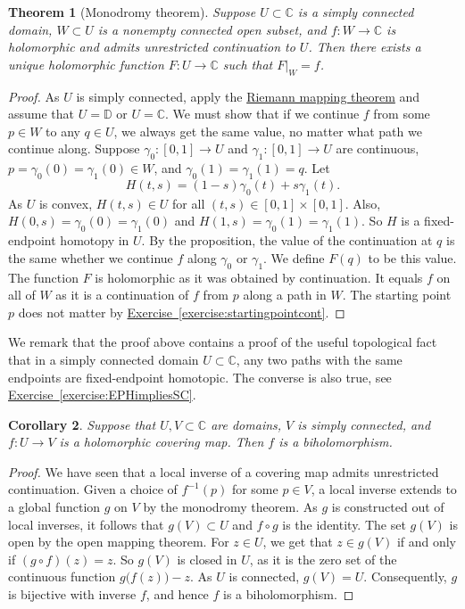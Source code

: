 \documentclass[12pt,openany]{book}
\newcommand{\C}{{\mathbb{C}}}
\newcommand{\D}{{\mathbb{D}}}
\theoremstyle{plain}
\newtheorem{thm}{Theorem}[section]
\newtheorem{cor}[thm]{Corollary}
\theoremstyle{remark}
\theoremstyle{definition}
\theoremstyle{exercise}
\theoremstyle{example}
\newcommand{\exerciseref}[1]{\hyperref[#1]{Exercise~\ref*{#1}}}
\begin{document}
\begin{thm}[Monodromy theorem]
Suppose $U \subset \C$ is a simply connected domain, $W \subset U$ is a
nonempty connected open subset, and
$f \colon W \to \C$ is holomorphic and admits unrestricted continuation
to $U$.  Then there exists
a unique holomorphic function $F \colon U \to \C$ such that $F|_W = f$.
\end{thm}

\begin{proof}
As $U$ is simply connected, apply the
\hyperref[thm:RMT]{Riemann mapping theorem}
and
assume that $U=\D$ or $U = \C$.
We must show that if we continue $f$ from some $p \in W$ to any $q \in U$, we
always get the same value,
no matter what path we continue along.
Suppose $\gamma_0 \colon [0,1] \to U$ and
$\gamma_1 \colon [0,1] \to U$ are continuous,
$p = \gamma_0(0)=\gamma_1(0) \in W$,
and
$\gamma_0(1)=\gamma_1(1)=q$.  Let
\begin{equation*}
H(t,s) = (1-s)\gamma_0(t)+s\gamma_1(t) .
\end{equation*}
As $U$ is convex, $H(t,s) \in U$ for all $(t,s) \in
[0,1]\times[0,1]$.  Also,
$H(0,s) = \gamma_0(0)=\gamma_1(0)$ and
$H(1,s) = \gamma_0(1)=\gamma_1(1)$.  So $H$ is a fixed-endpoint homotopy in
$U$. By the proposition, the value of the continuation at
$q$ is the same whether we continue $f$ along $\gamma_0$ or $\gamma_1$.
We define $F(q)$ to be this value.
The function $F$ is holomorphic as it was obtained by continuation.
It equals $f$ on all of $W$ as it is a continuation of $f$ from $p$ along
a path in $W$.  The starting point $p$ does not matter by
\exerciseref{exercise:startingpointcont}.
\end{proof}

We remark that the proof above contains
a proof of the useful topological fact that in a
simply connected domain $U \subset \C$, any two 
paths with the same endpoints are fixed-endpoint homotopic.
The converse is also true, see
\exerciseref{exercise:EPHimpliesSC}.

\begin{cor}
Suppose that $U,V \subset \C$ are domains, $V$ is simply connected,
and $f \colon U \to V$ is a holomorphic covering map.
Then $f$ is a biholomorphism.
\end{cor}

\begin{proof}
We have seen that a local inverse of a covering map admits unrestricted
continuation.  Given a choice of $f^{-1}(p)$ for some $p \in V$,
a local inverse extends to a global function $g$ on $V$
by the monodromy theorem.
As $g$ is constructed out of local inverses, it follows that
$g(V) \subset U$ and $f \circ g$ is the identity.
The set $g(V)$ is open by the open mapping theorem.
For $z \in U$, we get that $z \in g(V)$ if and only if $(g \circ f)(z) = z$.
So $g(V)$ is closed in $U$,
as it is the zero set of the continuous function $g\bigl(f(z)\bigr)-z$.
As $U$ is connected, $g(V) = U$.
Consequently, $g$ is bijective with inverse $f$,
and hence $f$ is a biholomorphism.
\end{proof}
\end{document}
